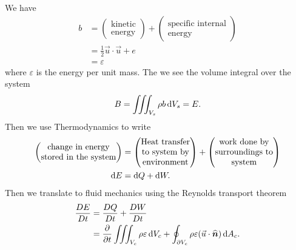 \begin{node}\label{node:fall:lec04:conservation-of-energy}
We have
\begin{subequations}
  \begin{align}
b &=
\begin{pmatrix}\mbox{kinetic}\\
\mbox{energy}
\end{pmatrix} + \begin{pmatrix}
\mbox{specific internal}\\
\mbox{energy}
\end{pmatrix}\\
&=\frac{1}{2}\vec{u}\cdot\vec{u} + e\\
&=\varepsilon
  \end{align}
\end{subequations}
where $\varepsilon$ is the energy per unit mass. The we see the volume
integral over the system
\begin{equation}
B = \iiint_{V_{s}}\rho b\,\mathrm{d} V_{s} = E.
\end{equation}
Then we use Thermodynamics to write
\begin{subequations}
  \begin{align}
\begin{pmatrix}\mbox{change in energy}\\
\mbox{stored in the system}
\end{pmatrix} &= \begin{pmatrix}\mbox{Heat transfer}\\
\mbox{to system by}\\
\mbox{environment}
\end{pmatrix} + \begin{pmatrix}\mbox{work done by}\\
  \mbox{surroundings to}\\
  \mbox{system}
\end{pmatrix}\\
\mathrm{d} E &= \mathrm{d} Q + \mathrm{d} W.
\end{align}
\end{subequations}
Then we translate to fluid mechanics using the Reynolds transport
theorem
\begin{subequations}
  \begin{align}
\frac{D E}{D t} &= \frac{D Q}{D t} + \frac{D W}{D t}\\
&=\frac{\partial}{\partial t}\iiint_{V_{c}}\rho\varepsilon\,\D V_{c}
+\oint_{\boundary V_{c}}\rho\varepsilon(\vec{u}\cdot\UnitNormalVec{n})\,\D A_{c}.

\end{align}
\end{subequations}
\end{node}
